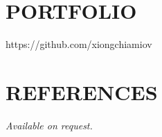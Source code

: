 \documentclass[margin,line]{resume}
\begin{document}
\begin{resume}
    \section{\mysidestyle \textbf{\large{P}\small{ORTFOLIO}}}

    https://github.com/xiongchiamiov

\sectionline

\section{\mysidestyle \textbf{\large{R}\small{EFERENCES}}}

    \textsl{Available on request.}

\end{resume}
\end{document}
